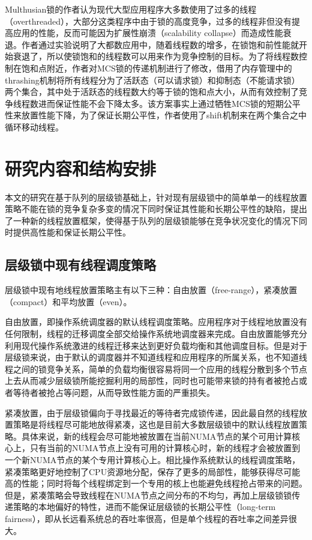Multhusian锁\cite{dice2017malthusian}的作者认为现代大型应用程序大多数使用了过多的线程（overthreaded），大部分这类程序中由于锁的高度竞争，过多的线程非但没有提高应用的性能，反而可能因为扩展性崩溃（scalability collapse）而造成性能衰退。作者通过实验说明了大都数应用中，随着线程数的增多，在锁饱和前性能就开始衰退了，所以使锁饱和的线程数可以用来作为竞争控制的目标。为了将线程数控制在饱和点附近，作者对MCS锁的传递机制进行了修改，借用了内存管理中的thrashing机制\cite{denning1980working}将所有线程分为了活跃态（可以请求锁）和抑制态（不能请求锁）两个集合，其中处于活跃态的线程数大约等于锁的饱和点大小，从而有效控制了竞争线程数进而保证性能不会下降太多。该方案事实上通过牺牲MCS锁的短期公平性来放置性能下降，为了保证长期公平性，作者使用了shift机制来在两个集合之中循环移动线程。

\section{研究内容和结构安排}
本文的研究在基于队列的层级锁基础上，针对现有层级锁中的简单单一的线程放置策略不能在锁的竞争复杂多变的情况下同时保证其性能和长期公平性的缺陷，提出了一种新的线程放置框架，使得基于队列的层级锁能够在竞争状况变化的情况下同时提供高性能和保证长期公平性。

\subsection{层级锁中现有线程调度策略}
层级锁中现有地线程放置策略主有以下三种：自由放置（free-range），紧凑放置（compact）和平均放置（even）。

自由放置，即操作系统调度器的默认线程调度策略。应用程序对于线程地放置没有任何限制，线程的迁移调度全部交给操作系统地调度器来完成。自由放置能够充分利用现代操作系统激进的线程迁移来达到更好负载均衡和其他调度目标。但是对于层级锁来说，由于默认的调度器并不知道线程和应用程序的所属关系，也不知道线程之间的锁竞争关系，简单的负载均衡很容易将同一个应用的线程分散到多个节点上去从而减少层级锁所能挖掘利用的局部性，同时也可能带来锁的持有者被抢占或者等待者被抢占等问题，从而导致性能方面的严重损失。

紧凑放置，由于层级锁偏向于寻找最近的等待者完成锁传递，因此最自然的线程放置策略是将线程尽可能地放得紧凑，这也是目前大多数层级锁中的默认线程放置策略。具体来说，新的线程会尽可能地被放置在当前NUMA节点的某个可用计算核心上，只有当前的NUMA节点上没有可用的计算核心时，新的线程才会被放置到一个新NUMA节点的某个专用计算核心上。相比操作系统默认的线程调度策略，紧凑策略更好地控制了CPU资源地分配，保存了更多的局部性，能够获得尽可能高的性能；同时将每个线程绑定到一个专用的核上也能避免线程抢占带来的问题。但是，紧凑策略会导致线程在NUMA节点之间分布的不均匀，再加上层级锁锁传递策略的本地偏好的特性，进而不能保证层级锁的长期公平性（long-term fairness），即从长远看系统总的吞吐率很高，但是单个线程的吞吐率之间差异很大。

